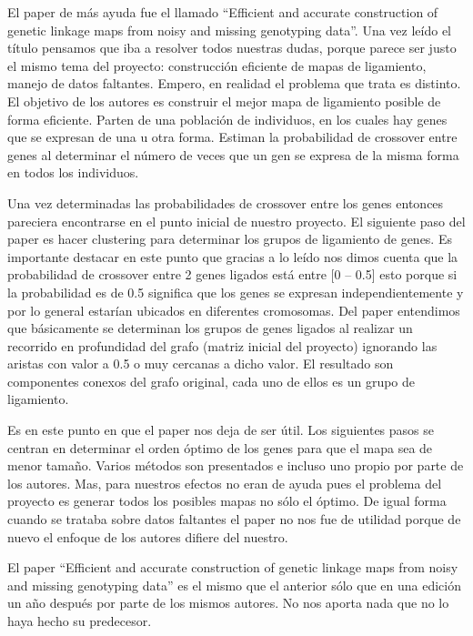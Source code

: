 \documentclass{article}
\begin{document}
	El paper de más ayuda fue el llamado “Efficient and accurate construction of genetic linkage maps from noisy and missing genotyping data”. Una vez leído el título pensamos que iba a resolver todos nuestras dudas, porque parece ser justo el mismo tema del proyecto: construcción eficiente de mapas de ligamiento, manejo de datos faltantes. Empero, en realidad el problema que trata es distinto. El objetivo de los autores es construir el mejor mapa de ligamiento posible de forma eficiente. Parten de una población de individuos, en los cuales hay genes que se expresan de una u otra forma. Estiman la probabilidad de crossover entre genes al determinar el número de veces que un gen se expresa de la misma forma en todos los individuos.

	Una vez determinadas las probabilidades de crossover entre los genes entonces pareciera encontrarse en el punto inicial de nuestro proyecto. El siguiente paso del paper es hacer clustering para determinar los grupos de ligamiento de genes. Es importante destacar en este punto que gracias a lo leído nos dimos cuenta que la probabilidad de crossover entre 2 genes ligados está entre [0 – 0.5] esto porque si la probabilidad es de 0.5 significa que los genes se expresan independientemente y por lo general estarían ubicados en diferentes cromosomas. Del paper entendimos que básicamente se determinan los grupos de genes ligados al realizar un recorrido en profundidad del grafo (matriz inicial del proyecto) ignorando las aristas con valor a 0.5 o muy cercanas a dicho valor. El resultado son componentes conexos del grafo original, cada uno de ellos es un grupo de ligamiento.

	Es en este punto en que el paper nos deja de ser útil. Los siguientes pasos se centran en determinar el orden óptimo de los genes para que el mapa sea de menor tamaño. Varios métodos son presentados e incluso uno propio por parte de los autores. Mas, para nuestros efectos no eran de ayuda pues el problema del proyecto es generar todos los posibles mapas no sólo el óptimo. De igual forma cuando se  trataba sobre datos faltantes el paper no nos fue de utilidad porque de nuevo el enfoque de los autores difiere del nuestro.

	El paper “Efficient and accurate construction of genetic linkage maps from noisy and missing genotyping data” es el mismo que el anterior sólo que en una edición un año después por parte de los mismos autores. No nos aporta nada que no lo haya hecho su predecesor.

	
	
\end{document}
